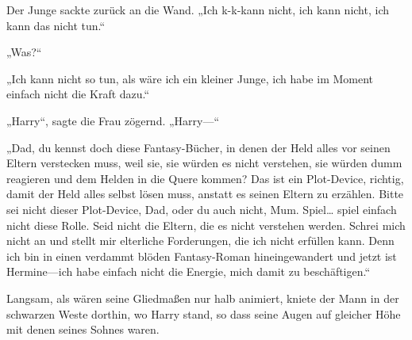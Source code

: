 Der Junge sackte zurück an die Wand.
„Ich k-k-kann nicht, ich kann nicht, ich kann das nicht tun.“

„Was?“

„Ich kann nicht so tun, als wäre ich ein kleiner Junge, ich habe im Moment einfach nicht die Kraft dazu.“

„Harry“, sagte die Frau zögernd. „Harry—“

„Dad, du kennst doch diese Fantasy-Bücher, in denen der Held alles vor seinen Eltern verstecken muss, weil sie, sie würden es nicht verstehen, sie würden dumm reagieren und dem Helden in die Quere kommen? Das ist ein Plot-Device, richtig, damit der Held alles selbst lösen muss, anstatt es seinen Eltern zu erzählen. Bitte sei nicht dieser Plot-Device, Dad, oder du auch nicht, Mum. Spiel… spiel einfach nicht diese Rolle. Seid nicht die Eltern, die es nicht verstehen werden. Schrei mich nicht an und stellt mir elterliche Forderungen, die ich nicht erfüllen kann. Denn ich bin in einen verdammt blöden Fantasy-Roman hineingewandert und jetzt ist Hermine—ich habe einfach nicht die Energie, mich damit zu beschäftigen.“

Langsam, als wären seine Gliedmaßen nur halb animiert, kniete der Mann in der schwarzen Weste dorthin, wo Harry stand, so dass seine Augen auf gleicher Höhe mit denen seines Sohnes waren.

